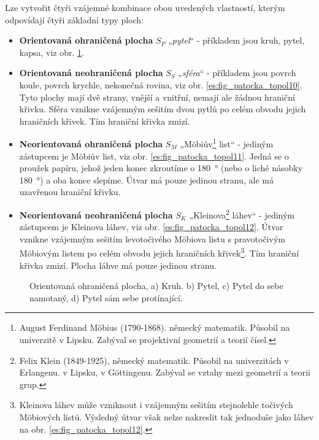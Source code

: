       Lze vytvořit čtyři vzájemné kombinace obou uvedených vlastností, kterým odpovídají čtyři      
      základní typy ploch:
      \begin{itemize}[noitemsep]
        \item \textbf{Orientovaná ohraničená plocha} \(S_P\) „\emph{pytel}“ - příkladem jsou kruh, 
              pytel, kapsa, viz obr. \ref{es:fig_patocka_topol09}.
        \item \textbf{Orientovaná neohraničená plocha} \(S_S\) „\emph{sféra}“ - příkladem jsou 
              povrch koule, povrch krychle, nekonečná rovina, viz obr. 
              \ref{es:fig_patocka_topol10}. Tyto plochy mají dvě strany, vnější a vnitřní, nemají 
              ale žádnou hraniční křivku. Sféra vznikne vzájemným sešitím dvou pytlů po celém 
              obvodu jejich hraničních křivek. Tím hraniční křivka zmizí.      
        \item \textbf{Neorientovaná ohraničená plocha} \(S_M\) „Möbiův\footnote{August Ferdinand 
              Möbius (1790-1868). německý matematik. Působil na univerzitě v Lipsku. Zabýval se 
              projektivní geometrií a teorií čísel.} list“ - jediným zástupcem je Möbiův list, viz 
              obr. \ref{es:fig_patocka_topol11}. Jedná se o proužek papíru, jehož jeden konec 
              zkroutíme o \qty{180}{\degree} (nebo o liché násobky \qty{180}{\degree}) 
              a oba konce slepíme. Útvar má pouze jedinou stranu, ale má uzavřenou hraniční křivku.
        \item \textbf{Neorientovaná neohraničená plocha} \(S_K\) „Kleinova\footnote{Felix Klein 
              (1849-1925), německý matematik. Působil na univerzitách v Erlangenu. v Lipsku, v 
              Göttingenu. Zabýval se vztahy mezi geometrií a teorii grup.} láhev“ - jediným 
              zástupcem je Kleinova láhev, viz obr. \ref{es:fig_patocka_topol12}. Útvar vznikne 
              vzájemným sešitím levotočivého Möbiova listu s pravotočivým Möbiovým listem po celém 
              obvodu jejich hraničních křivek\footnote{Kleinova láhev může vzniknout i vzájemným 
              sešitím stejnolehle točivých Möbiových listů. Výsledný útvar však nelze 
              nakreslit tak jednoduše jako láhev na obr. \ref{es:fig_patocka_topol12}.}. Tím 
              hraniční křivka zmizí. Plocha láhve má pouze jedinou stranu.
    \end{itemize}
    \begin{figure}[ht!]
      \centering  
      \caption{Orientovaná ohraničená plocha, a) Kruh. b) Pytel, c) Pytel do sebe namotaný, d) Pytel
               sám sebe protínající. \cite[s.~53]{Patocka4}} 
      \label{es:fig_patocka_topol09}
    \end{figure}
      

